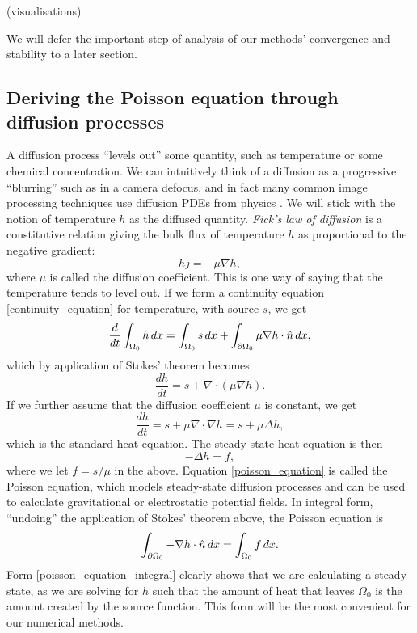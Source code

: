 \vskip 0.2in
(visualisations)
\vskip 0.2in

We will defer the important step of analysis of our methods' convergence and stability to a later section.
\subsection{Deriving the Poisson equation through diffusion processes}
A diffusion process ``levels out'' some quantity, such as temperature or some chemical concentration. We can intuitively think of a diffusion as a
progressive ``blurring''
such as in a camera defocus, and in fact many common image processing techniques use diffusion PDEs from physics \cite{tum}. We will stick with
the notion of temperature $h$ as the diffused quantity.
\textit{Fick's law of diffusion} is a constitutive relation giving the bulk flux of temperature $h$ as proportional to the negative gradient:
    $$hj = -\mu\nabla h,$$
where $\mu$ is called the diffusion coefficient.
This is one way of saying that the temperature tends to level out.
If we form a continuity equation \eqref{continuity_equation} for temperature, with source $s$, we get
\begin{equation}\label{heat_equation_integral}
    \frac{d}{dt} \int_{\Omega_0} h\,dx = \int_{\Omega_0} s\,dx + \int_{{\partial\Omega_0}} \mu \nabla h \cdot \hat{n}\,dx,
\end{equation}
which by application of Stokes' theorem becomes
\begin{equation}\label{heat_equation_differential}
    \frac{dh}{dt} = s + \nabla \cdot \left(\mu \nabla h\right).
\end{equation}
If we further assume that the diffusion coefficient $\mu$ is constant, we get
\begin{equation}\label{heat_equation_differential_constant}
    \frac{dh}{dt} = s + \mu\nabla \cdot \nabla h = s + \mu\Delta h,
\end{equation}
which is the standard heat equation.
The steady-state heat equation is then
\begin{equation}\label{poisson_equation}
    -\Delta h = f,
\end{equation}
where we let $f = s/\mu$ in the above. Equation \eqref{poisson_equation} is called the Poisson equation,
which models steady-state diffusion processes and can be used to calculate gravitational or electrostatic potential fields.
In integral form, ``undoing'' the application of Stokes' theorem above, the Poisson equation is
\begin{equation}\label{poisson_equation_integral}
    \int_{{\partial\Omega_0}} -\nabla h\cdot \hat{n}\,dx = \int_{{\Omega_0}} f\,dx.
\end{equation}
Form \eqref{poisson_equation_integral} clearly shows that we are calculating a steady state,
as we are solving for $h$ such that the amount of heat that leaves $\Omega_0$ is the amount created by the source function.
This form will be the most convenient for our numerical methods.
